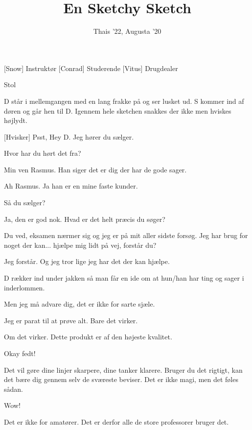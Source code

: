\documentclass[a4paper,11pt]{article}
\title{En Sketchy Sketch}
\author{Thais '22, Augusta '20}
\begin{document}
\maketitle

\begin{roles}
[Snow] Instruktør
[Conrad] Studerende 
[Vitus] Drugdealer 
\end{roles}

\begin{props}
\item{Stol}
\end{props}


\begin{sketch}

\scene D står i mellemgangen med en lang frakke på og ser lusket ud. S kommer ind af døren og går hen til D. Igennem hele sketchen snakkes der ikke men hviskes højlydt.  

[Hvisker] Psst, Hey D. Jeg hører du sælger.

 Hvor har du hørt det fra?

 Min ven Rasmus. Han siger det er dig der har de gode sager.

 Ah Rasmus. Ja han er en mine faste kunder.

 Så du sælger?

 Ja, den er god nok. Hvad er det helt præcis du søger?

 Du ved, eksamen nærmer sig og jeg er på mit aller sidste forsøg. Jeg har brug for noget der kan... hjælpe mig lidt på vej, forstår du? 

 Jeg forstår. Og jeg tror lige jeg har det der kan hjælpe.

\scene D rækker ind under jakken så man får en ide om at hun/han har ting og sager i inderlommen.

 Men jeg må advare dig, det er ikke for sarte sjæle. 

 Jeg er parat til at prøve alt. Bare det virker.

 Om det virker. Dette produkt er af den højeste kvalitet.

 Okay fedt!

 Det vil gøre dine linjer skarpere, dine tanker klarere. Bruger du det rigtigt, kan det bære dig gennem selv de sværeste beviser. Det er ikke magi, men det føles sådan.

 Wow! 

 Det er ikke for amatører. Det er derfor alle de store professorer bruger det.


\end{sketch}
\end{document}
